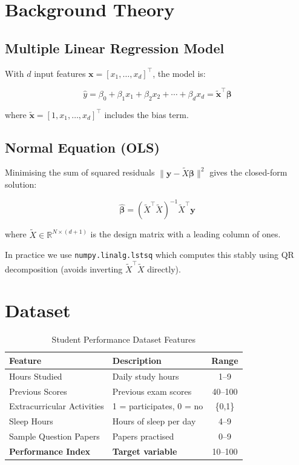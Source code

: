 \documentclass[12pt,a4paper]{article}
\begin{document}
\section{Background Theory}

\subsection{Multiple Linear Regression Model}

With $d$ input features $\mathbf{x} = [x_1, \ldots, x_d]^\top$, the model is:

\begin{equation}
  \hat{y} = \beta_0 + \beta_1 x_1 + \beta_2 x_2 + \cdots + \beta_d x_d
           = \tilde{\mathbf{x}}^\top \boldsymbol{\beta}
  \label{eq:mlr}
\end{equation}

where $\tilde{\mathbf{x}} = [1, x_1, \ldots, x_d]^\top$ includes the bias term.

\subsection{Normal Equation (OLS)}

Minimising the sum of squared residuals $\|\mathbf{y} - \tilde{X}\boldsymbol{\beta}\|^2$ gives the closed-form solution:

\begin{equation}
  \hat{\boldsymbol{\beta}} = (\tilde{X}^\top \tilde{X})^{-1} \tilde{X}^\top \mathbf{y}
  \label{eq:normal}
\end{equation}

where $\tilde{X} \in \mathbb{R}^{N\times(d+1)}$ is the design matrix with a leading column of ones.

In practice we use \texttt{numpy.linalg.lstsq} which computes this stably using QR decomposition (avoids inverting $\tilde{X}^\top\tilde{X}$ directly).

\section{Dataset}

\begin{table}[H]
\centering
\caption{Student Performance Dataset Features}
\begin{tabular}{l l c}
\toprule
\textbf{Feature} & \textbf{Description} & \textbf{Range} \\ \midrule
Hours Studied         & Daily study hours            & 1--9 \\
Previous Scores       & Previous exam scores         & 40--100 \\
Extracurricular Activities & 1 = participates, 0 = no & \{0,1\} \\
Sleep Hours           & Hours of sleep per day       & 4--9 \\
Sample Question Papers & Papers practised             & 0--9 \\
\midrule
\textbf{Performance Index} & \textbf{Target variable} & 10--100 \\
\bottomrule
\end{tabular}
\end{table}
\end{document}
